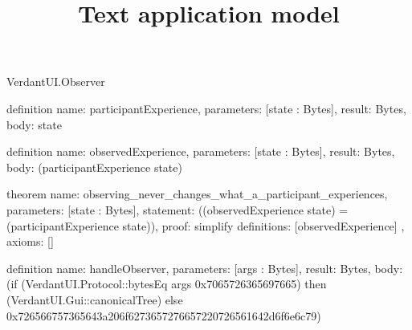 \begin{lexlean}{VerdantUI.Observer}
\title{Text application model}
\begin{semanticmodule}
definition{
  name: participantExperience,
  parameters: [state : Bytes],
  result: Bytes,
  body: state
}

definition{
  name: observedExperience,
  parameters: [state : Bytes],
  result: Bytes,
  body: (participantExperience state)
}

theorem{
  name: observing_never_changes_what_a_participant_experiences,
  parameters: [state : Bytes],
  statement: ((observedExperience state) = (participantExperience state)),
  proof: simplify{
    definitions: [observedExperience]
  },
  axioms: []
}

definition{
  name: handleObserver,
  parameters: [args : Bytes],
  result: Bytes,
  body: (if (VerdantUI.Protocol::bytesEq args 0x7065726365697665) then (VerdantUI.Gui::canonicalTree) else
    0x726566757365643a206f6273657276657220726561642d6f6e6c79)
}
\end{semanticmodule}
\end{lexlean}
